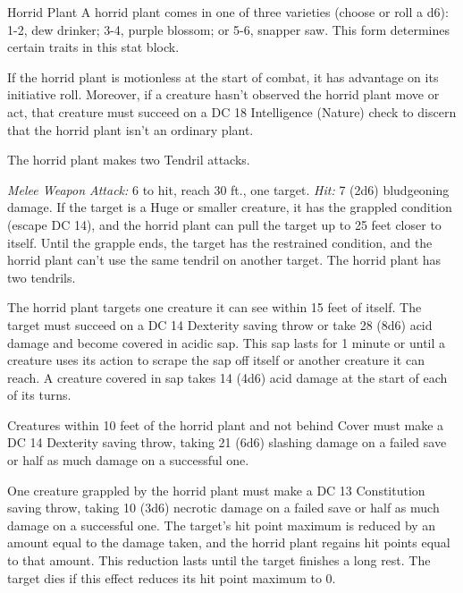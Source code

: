 \documentclass[10pt,a4paper,twoside,bg=print,twocolumn,openany,nodeprecatedcode]{dndbook}
\begin{document}
\begin{DndMonster}[float=t]{Horrid Plant}
\DndMonsterBasics[
armor-class = {6},
hit-points = {\DndDice{5d10 + 15}},
speed = {5 ft.}
]
\DndMonsterAbilityScores[
 str = 18,
 dex = 3,
 con = 17,
 int = 1,
 wis = 10,
 cha = 1
]
\DndMonsterDetails[
condition-immunities = {blinded, deafened},
senses = {blindsight 60 ft. (can't see beyond this radius), passive perception 10},
challenge = 4,
]
A horrid plant comes in one of three varieties (choose or roll a d6): 1-2, dew drinker; 3-4, purple blossom; or 5-6, snapper saw. This form determines certain traits in this stat block.

If the horrid plant is motionless at the start of combat, it has advantage on its initiative roll. Moreover, if a creature hasn't observed the horrid plant move or act, that creature must succeed on a DC 18 Intelligence (Nature) check to discern that the horrid plant isn't an ordinary plant.

The horrid plant makes two Tendril attacks.

\textsl{Melee Weapon Attack:} 6 to hit, reach 30 ft., one target. \textsl{Hit:} 7 (2d6) bludgeoning damage. If the target is a Huge or smaller creature, it has the grappled condition (escape DC 14), and the horrid plant can pull the target up to 25 feet closer to itself. Until the grapple ends, the target has the restrained condition, and the horrid plant can't use the same tendril on another target. The horrid plant has two tendrils.

The horrid plant targets one creature it can see within 15 feet of itself. The target must succeed on a DC 14 Dexterity saving throw or take 28 (8d6) acid damage and become covered in acidic sap. This sap lasts for 1 minute or until a creature uses its action to scrape the sap off itself or another creature it can reach. A creature covered in sap takes 14 (4d6) acid damage at the start of each of its turns.

Creatures within 10 feet of the horrid plant and not behind Cover must make a DC 14 Dexterity saving throw, taking 21 (6d6) slashing damage on a failed save or half as much damage on a successful one.

One creature grappled by the horrid plant must make a DC 13 Constitution saving throw, taking 10 (3d6) necrotic damage on a failed save or half as much damage on a successful one. The target's hit point maximum is reduced by an amount equal to the damage taken, and the horrid plant regains hit points equal to that amount. This reduction lasts until the target finishes a long rest. The target dies if this effect reduces its hit point maximum to 0.

\end{DndMonster}
\end{document}
